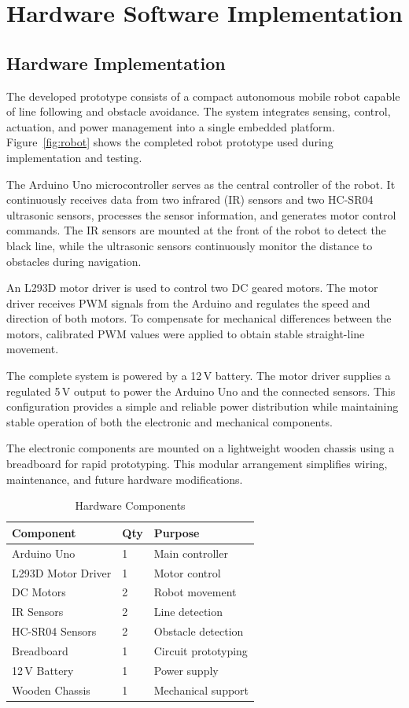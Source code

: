 \section{Hardware Software Implementation}
\label{sec:hardware_software_implementation}

\subsection{Hardware Implementation}

The developed prototype consists of a compact autonomous mobile robot capable of line following and obstacle avoidance. The system integrates sensing, control, actuation, and power management into a single embedded platform. Figure~\ref{fig:robot} shows the completed robot prototype used during implementation and testing.

The Arduino Uno microcontroller serves as the central controller of the robot. It continuously receives data from two infrared (IR) sensors and two HC-SR04 ultrasonic sensors, processes the sensor information, and generates motor control commands. The IR sensors are mounted at the front of the robot to detect the black line, while the ultrasonic sensors continuously monitor the distance to obstacles during navigation.

An L293D motor driver is used to control two DC geared motors. The motor driver receives PWM signals from the Arduino and regulates the speed and direction of both motors. To compensate for mechanical differences between the motors, calibrated PWM values were applied to obtain stable straight-line movement.

The complete system is powered by a 12\,V battery. The motor driver supplies a regulated 5\,V output to power the Arduino Uno and the connected sensors. This configuration provides a simple and reliable power distribution while maintaining stable operation of both the electronic and mechanical components.

The electronic components are mounted on a lightweight wooden chassis using a breadboard for rapid prototyping. This modular arrangement simplifies wiring, maintenance, and future hardware modifications.

\begin{table}[ht]
\caption{Hardware Components}
\centering
\begin{tabular}{lll}
\hline
\textbf{Component} & \textbf{Qty} & \textbf{Purpose} \\
\hline
Arduino Uno & 1 & Main controller \\
L293D Motor Driver & 1 & Motor control \\
DC Motors & 2 & Robot movement \\
IR Sensors & 2 & Line detection \\
HC-SR04 Sensors & 2 & Obstacle detection \\
Breadboard & 1 & Circuit prototyping \\
12\,V Battery & 1 & Power supply \\
Wooden Chassis & 1 & Mechanical support \\
\hline
\end{tabular}
\label{tab:hardware}
\end{table}

